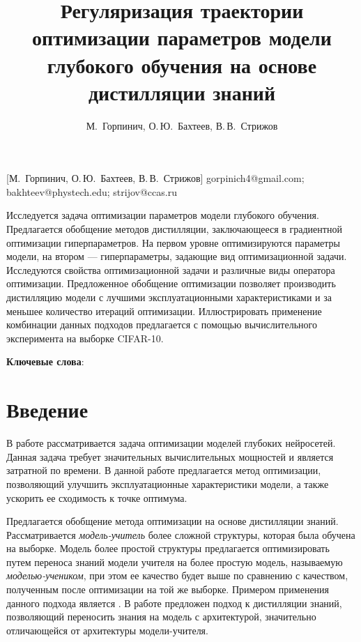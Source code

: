 \documentclass[12pt, twoside]{article}
\begin{document}
\title
    [Оптимизация параметров модели на основе дистилляции знаний] %
    {Регуляризация траектории оптимизации параметров модели глубокого обучения на основе дистилляции знаний}
\author
    [М.~Горпинич] %
    {М.~Горпинич, О.\,Ю.~Бахтеев, В.\,В.~Стрижов} %
    [М.~Горпинич, О.\,Ю.~Бахтеев, В.\,В.~Стрижов] %
\email
    {gorpinich4@gmail.com; bakhteev@phystech.edu;  strijov@ccas.ru}
\abstract
    {Исследуется задача оптимизации параметров модели глубокого обучения. Предлагается обобщение методов дистилляции, заключающееся в градиентной оптимизации гиперпараметров. На первом уровне оптимизируются параметры модели, на втором --- гиперпараметры, задающие вид оптимизационной задачи. Исследуются свойства оптимизационной задачи и различные виды оператора оптимизации. Предложенное обобщение оптимизации позволяет производить дистилляцию модели с лучшими эксплуатационными характеристиками и за меньшее количество итераций оптимизации. Иллюстрировать применение комбинации данных подходов предлагается с помощью вычислительного эксперимента на выборке CIFAR-10.
	
\bigskip
\noindent
\textbf{Ключевые слова}: \emph {}
}

\doi{}
\receivedRus{}
\receivedEng{}

\maketitle
\linenumbers

\section{Введение}
В работе рассматривается задача оптимизации моделей глубоких нейросетей. Данная задача требует значительных вычислительных мощностей и является затратной по времени. В данной работе предлагается метод оптимизации, позволяющий улучшить эксплуатационные характеристики модели, а также ускорить ее сходимость к точке оптимума.

Предлагается обобщение метода оптимизации на основе дистилляции знаний. Рассматривается \textit{модель-учитель} более сложной структуры, которая была обучена на выборке. Модель более простой структуры предлагается оптимизировать путем переноса знаний модели учителя на более простую модель, называемую \textit{моделью-учеником}, при этом ее качество будет выше по сравнению с качеством, полученным после оптимизации на той же выборке. Примером применения данного подхода является \cite{journals/corr/HintonVD15}. В работе \cite{conf/cvpr/PassalisTT20} предложен подход к дистилляции знаний, позволяющий переносить знания на модель с архитектурой, значительно отличающейся от архитектуры модели-учителя.
\end{document}
